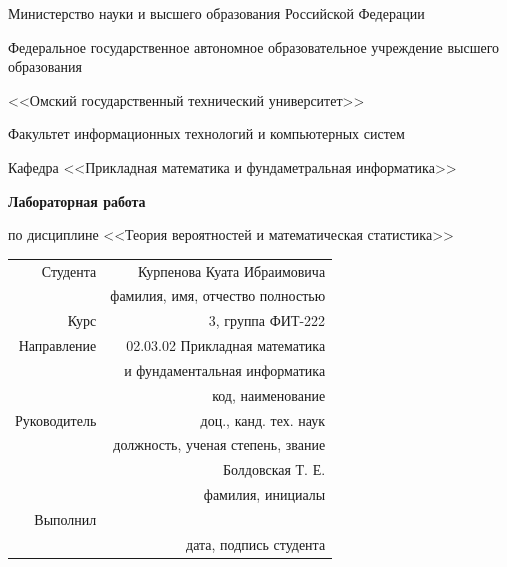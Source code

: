 \documentclass[a4paper]{article}
\begin{document}
    \thispagestyle{empty}

    \begin{center}
        Министерство науки и высшего образования Российской Федерации

        Федеральное государственное автономное образовательное учреждение высшего образования

        <<Омский государственный технический университет>>

        \vspace{1cm}
        Факультет информационных технологий и компьютерных систем

        Кафедра <<Прикладная математика и фундаметральная информатика>>

        \vspace{3cm}
        \textbf{Лабораторная работа}

        по дисциплине <<Теория вероятностей и математическая статистика>>
    \end{center}
    
    \vspace{3cm}
    \begin{flushright}    
        \begin{tabular}{ r r }
            Студента & Курпенова Куата Ибраимовича \\
            \cline{2-2}
            & \tiny{фамилия, имя, отчество полностью} \\

            Курс & 3, группа ФИТ-222 \\
            \cline{2-2}
            Направление & 02.03.02 Прикладная математика \\
            \cline{2-2}
            & и фундаментальная информатика \\
            \cline{2-2}
            & \tiny{код, наименование} \\
            
            Руководитель & доц., канд. тех. наук \\
            \cline{2-2}
            & \tiny{должность, ученая степень, звание} \\
            & Болдовская Т. Е. \\
            \cline{2-2}
            & \tiny{фамилия, инициалы} \\
            
            Выполнил & \\
            \cline{2-2}
            & \tiny{дата, подпись студента} \\
            
        \end{tabular}
    \end{flushright}
    
\end{document}
